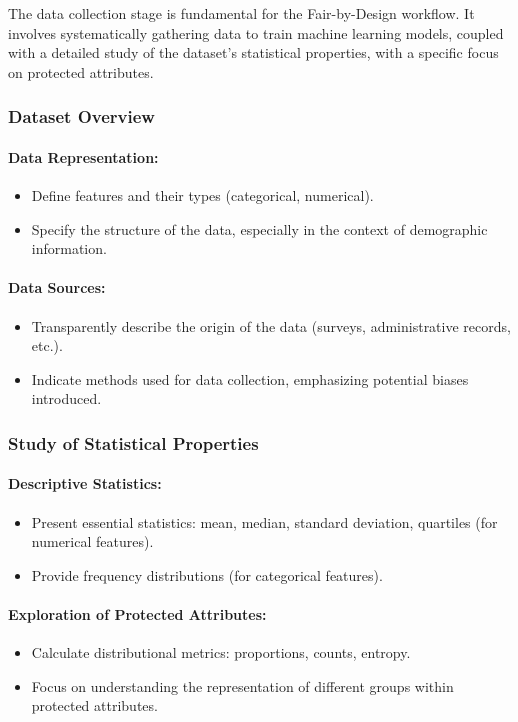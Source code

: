 The data collection stage is fundamental for the Fair-by-Design workflow. It involves systematically gathering data to train machine learning models, coupled with a detailed study of the dataset's statistical properties, with a specific focus on protected attributes.

\subsubsection{Dataset Overview}

\paragraph{Data Representation:}
\begin{itemize}
    \item Define features and their types (categorical, numerical).
    \item Specify the structure of the data, especially in the context of demographic information.
\end{itemize}

\paragraph{Data Sources:}
\begin{itemize}
    \item Transparently describe the origin of the data (surveys, administrative records, etc.).
    \item Indicate methods used for data collection, emphasizing potential biases introduced.
\end{itemize}

\subsubsection{Study of Statistical Properties}

\paragraph{Descriptive Statistics:}
\begin{itemize}
    \item Present essential statistics: mean, median, standard deviation, quartiles (for numerical features).
    \item Provide frequency distributions (for categorical features).
\end{itemize}

\paragraph{Exploration of Protected Attributes:}
\begin{itemize}
    \item Calculate distributional metrics: proportions, counts, entropy.
    \item Focus on understanding the representation of different groups within protected attributes.
\end{itemize}

